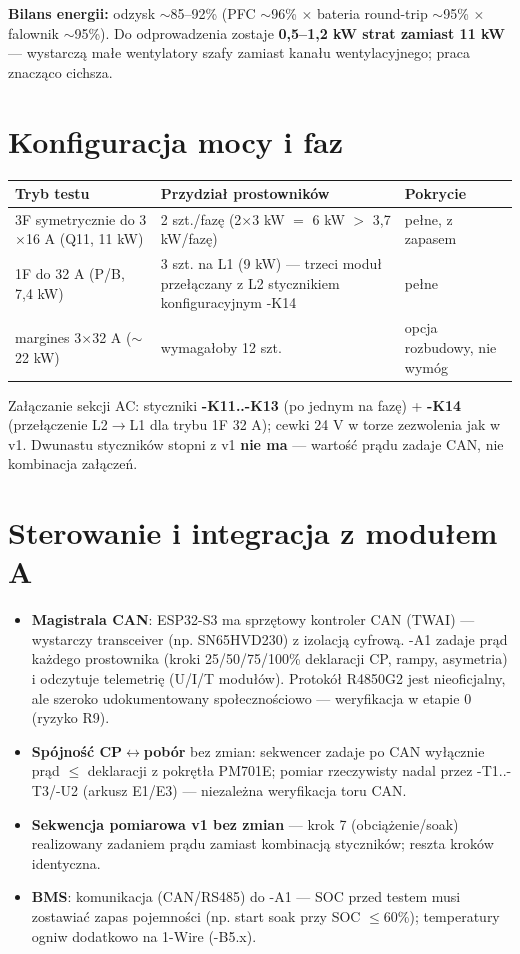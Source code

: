 \documentclass[11pt,a4paper]{article}
\begin{document}
\textbf{Bilans energii:} odzysk $\sim$85--92\% (PFC $\sim$96\% $\times$ bateria round-trip $\sim$95\%
$\times$ falownik $\sim$95\%). Do odprowadzenia zostaje \textbf{0,5--1,2 kW strat zamiast 11 kW} ---
wystarczą małe wentylatory szafy zamiast kanału wentylacyjnego; praca znacząco cichsza.

\section{Konfiguracja mocy i faz}
\begin{longtable}{@{}p{}p{}p{}@{}}
\toprule
\textbf{Tryb testu} & \textbf{Przydział prostowników} & \textbf{Pokrycie}\\
\midrule
3F symetrycznie do 3$\times$16 A (Q11, 11 kW) & 2 szt./fazę (2$\times$3 kW $=$ 6 kW $>$ 3,7 kW/fazę) & pełne, z zapasem\\
1F do 32 A (P/B, 7,4 kW) & 3 szt. na L1 (9 kW) --- trzeci moduł przełączany z L2 stycznikiem konfiguracyjnym -K14 & pełne\\
margines 3$\times$32 A ($\sim$22 kW) & wymagałoby 12 szt. & opcja rozbudowy, nie wymóg\\
\bottomrule
\end{longtable}
Załączanie sekcji AC: styczniki \textbf{-K11..-K13} (po jednym na fazę) + \textbf{-K14} (przełączenie
L2$\rightarrow$L1 dla trybu 1F 32 A); cewki 24 V w torze zezwolenia jak w v1. Dwunastu styczników stopni
z v1 \textbf{nie ma} --- wartość prądu zadaje CAN, nie kombinacja załączeń.

\section{Sterowanie i integracja z modułem A}
\begin{itemize}
\item \textbf{Magistrala CAN}: ESP32-S3 ma sprzętowy kontroler CAN (TWAI) --- wystarczy transceiver
(np. SN65HVD230) z izolacją cyfrową. -A1 zadaje prąd każdego prostownika (kroki 25/50/75/100\% deklaracji CP,
rampy, asymetria) i odczytuje telemetrię (U/I/T modułów). Protokół R4850G2 jest nieoficjalny, ale szeroko
udokumentowany społecznościowo --- weryfikacja w etapie 0 (ryzyko R9).
\item \textbf{Spójność CP$\leftrightarrow$pobór} bez zmian: sekwencer zadaje po CAN wyłącznie prąd
$\le$ deklaracji z pokrętła PM701E; pomiar rzeczywisty nadal przez -T1..-T3/-U2 (arkusz E1/E3) ---
niezależna weryfikacja toru CAN.
\item \textbf{Sekwencja pomiarowa v1 bez zmian} --- krok 7 (obciążenie/soak) realizowany zadaniem prądu
zamiast kombinacją styczników; reszta kroków identyczna.
\item \textbf{BMS}: komunikacja (CAN/RS485) do -A1 --- SOC przed testem musi zostawiać zapas pojemności
(np. start soak przy SOC $\le$60\%); temperatury ogniw dodatkowo na 1-Wire (-B5.x).
\end{itemize}
\end{document}
